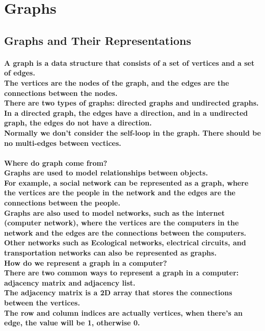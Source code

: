 \documentclass{article}
\begin{document}
\section{Graphs}

\subsection{Graphs and Their Representations}

\paragraph{
    A graph is a data structure that consists of a set of vertices and a set of edges.\\
    The vertices are the nodes of the graph, and the edges are the connections between the nodes.\\
    There are two types of graphs: directed graphs and undirected graphs.\\
    In a directed graph, the edges have a direction, and in a undirected graph, the edges do not have a direction.\\
    Normally we don't consider the self-loop in the graph. There should be no multi-edges between vectices.\\
}

\paragraph{
    Where do graph come from?\\
    Graphs are used to model relationships between objects.\\
    For example, a social network can be represented as a graph, where the vertices are the people in the network and the 
    edges are the connections between the people.\\
    Graphs are also used to model networks, such as the internet (computer network), where the vertices are the computers in the network and the
    edges are the connections between the computers.\\
    Other networks such as Ecological networks, electrical circuits, and transportation networks can also be represented as graphs.\\
    How do we represent a graph in a computer?\\
    There are two common ways to represent a graph in a computer: adjacency matrix and adjacency list.\\
    The adjacency matrix is a 2D array that stores the connections between the vertices.\\
    The row and column indices are actually vertices, when there's an edge, the value will be 1, otherwise 0.\\
}
\end{document}
